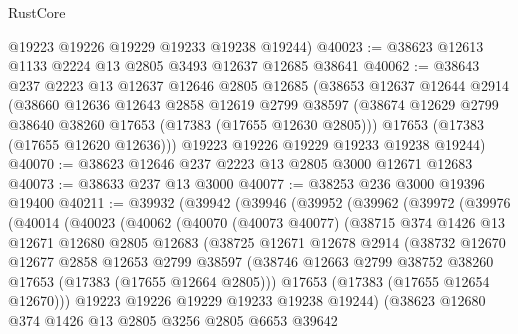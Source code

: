 \begin{lexlean}{RustCore}
\begin{coremodule}
      @19223
      @19226
      @19229
      @19233
      @19238
      @19244)
@40023 := @38623 @12613 @1133 @2224 @13 @2805 @3493 @12637 @12685 @38641
@40062 := @38643
    @237
    @2223
    @13
    @12637
    @12646
    @2805
    @12685
    (@38653
      @12637
      @12644
      @2914
      (@38660
        @12636
        @12643
        @2858
        @12619
        @2799
        @38597
        (@38674 @12629 @2799 @38640 @38260 @17653 (@17383 (@17655 @12630 @2805)))
        @17653
        (@17383 (@17655 @12620 @12636)))
      @19223
      @19226
      @19229
      @19233
      @19238
      @19244)
@40070 := @38623 @12646 @237 @2223 @13 @2805 @3000 @12671 @12683
@40073 := @38633 @237 @13 @3000
@40077 := @38253 @236 @3000 @19396 @19400
@40211 := @39932
    (@39942
      (@39946
        (@39952
          (@39962
            (@39972
              (@39976
                (@40014
                  (@40023
                    (@40062
                      (@40070
                        (@40073 @40077)
                        (@38715
                          @374
                          @1426
                          @13
                          @12671
                          @12680
                          @2805
                          @12683
                          (@38725
                            @12671
                            @12678
                            @2914
                            (@38732
                              @12670
                              @12677
                              @2858
                              @12653
                              @2799
                              @38597
                              (@38746
                                @12663
                                @2799
                                @38752
                                @38260
                                @17653
                                (@17383 (@17655 @12664 @2805)))
                              @17653
                              (@17383 (@17655 @12654 @12670)))
                            @19223
                            @19226
                            @19229
                            @19233
                            @19238
                            @19244)
                          (@38623
                            @12680
                            @374
                            @1426
                            @13
                            @2805
                            @3256
                            @2805
                            @6653
                            @39642

\end{coremodule}
\end{lexlean}
